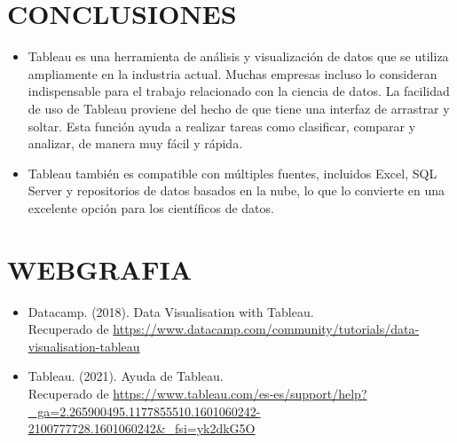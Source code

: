 \documentclass[12pt,letterpaper]{article}
\begin{document}
    \section{CONCLUSIONES}
    \begin{itemize}
        \item Tableau es una herramienta de análisis y visualización de datos que se utiliza ampliamente en la industria actual. Muchas empresas incluso lo consideran indispensable para el trabajo relacionado con la ciencia de datos. La facilidad de uso de Tableau proviene del hecho de que tiene una interfaz de arrastrar y soltar. Esta función ayuda a realizar tareas como clasificar, comparar y analizar, de manera muy fácil y rápida.
        \item Tableau también es compatible con múltiples fuentes, incluidos Excel, SQL Server y repositorios de datos basados en la nube, lo que lo convierte en una excelente opción para los científicos de datos.
    \end{itemize}
    \newpage
    \section{WEBGRAFIA}
    \begin{itemize}
        \item Datacamp. (2018). Data Visualisation with Tableau.\\
        Recuperado de \textcolor{azul}{\url{https://www.datacamp.com/community/tutorials/data-visualisation-tableau}}
        \item Tableau. (2021). Ayuda de Tableau.\\
        Recuperado de \textcolor{azul}{\url{https://www.tableau.com/es-es/support/help?_ga=2.265900495.1177855510.1601060242-2100777728.1601060242&_fsi=yk2dkG5O}}
    \end{itemize}
\end{document}

